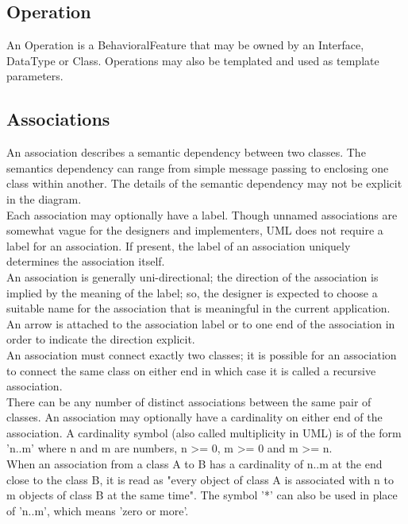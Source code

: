\subsection{Operation}
An Operation is a BehavioralFeature that may be owned by an Interface, DataType or Class. Operations may also be templated and used as template parameters.

\subsection{Associations}
An association describes a semantic dependency between two classes. The semantics dependency can range from simple message passing to enclosing one class within another. The details of the semantic dependency may not be explicit in the diagram.\\

 Each association may optionally have a label. Though unnamed associations are somewhat vague for the designers and implementers, UML does not require a label for an association. If present, the label of an association uniquely determines the association itself.\\ 
 
 An association is generally uni-directional; the direction of the association is implied by the meaning of the label; so, the designer is expected to choose a suitable name for the association that is meaningful in the current application.\\
 
 An arrow is attached to the association label or to one end of the association in order to indicate the direction explicit.\\
 
 An association must connect exactly two classes; it is possible for an association to connect the same class on either end in which case it is called a recursive association.\\
 
  There can be any number of distinct associations between the same pair of classes. An association may optionally have a cardinality on either end of the association. A cardinality symbol (also called multiplicity in UML) is of the form 'n..m' where n and m are numbers, n >= 0, m >= 0 and m >= n.\\
  
  When an association from a class A to B has a cardinality of n..m at the end close to the class B, it is read as "every object of class A is associated with n to m objects of class B at the same time". The symbol '*' can also be used in place of 'n..m', which means 'zero or more'.\\
  
